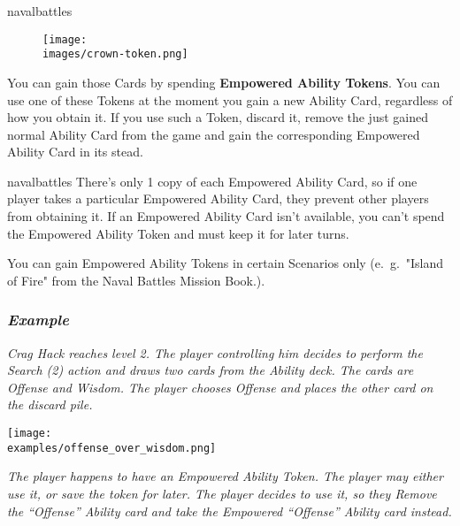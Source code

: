 \begin{multicols*}{2}
\begin{expansion}[before=\vspace*{-11mm}]{navalbattles}
    \setlength\intextsep{0pt}
    \setlength\columnsep{1em}
    \begin{wrapfigure}{r}{0.2\linewidth}
        \texttt{[image: \\images/crown-token.png]}
    \end{wrapfigure}
    You can gain those Cards by spending \textbf{Empowered Ability Tokens}.
    You can use one of these Tokens at the moment you gain a new Ability Card, regardless of how you obtain it.
    If you use such a Token, discard it, remove the just gained normal Ability Card from the game and gain the corresponding Empowered Ability Card in its stead.
\end{expansion}
\columnbreak
\begin{expansion}[before=\vspace*{-11mm}]{navalbattles}
    There's only 1 copy of each Empowered Ability Card, so if one player takes a particular Empowered Ability Card, they prevent other players from obtaining it.
    If an Empowered Ability Card isn't available, you can't spend the Empowered Ability Token and must keep it for later turns.
    \vspace*{1em}

    You can gain Empowered Ability Tokens in certain Scenarios only (e.~g.~"Island of Fire" from the Naval Battles Mission Book.).\\

    \subsubsection*{\textit{Example}}
    \textit{Crag Hack reaches level 2.
        The player controlling him decides to perform the Search (2) action and draws two cards from the Ability deck.
        The cards are Offense and Wisdom.
        The player chooses Offense and places the other card on the discard pile.}

    \begin{center}
      \texttt{[image: \\examples/offense\_over\_wisdom.png]}
    \end{center}

    \textit{The player happens to have an Empowered Ability Token.
        The player may either use it, or save the token for later.
        The player decides to use it, so they Remove the ``Offense'' Ability card and take the Empowered ``Offense'' Ability card instead.}


\end{expansion}
\end{multicols*}

